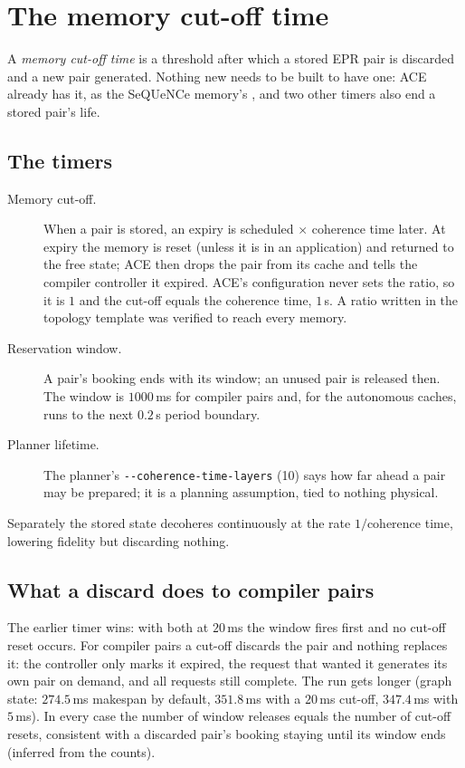 \chapter{The memory cut-off time}
\label{ch:cutoff}

A \emph{memory cut-off time} is a threshold after which a stored EPR pair is discarded and a new pair generated. Nothing new needs to be built to have one: ACE already has it, as the SeQUeNCe memory's
, and two other timers also end a stored pair's life.

\section{The timers}
\begin{description}
  \item[Memory cut-off.] When a pair is stored, an expiry is scheduled  $\times$ coherence time later. At expiry the memory is reset (unless it is in an application) and returned to the free state; ACE then drops the
        pair from its cache and tells the compiler controller it expired. ACE's configuration never sets the ratio, so it is $1$ and the cut-off equals the coherence time, $1$\,s. A ratio written in the topology template was verified to reach every memory.
  \item[Reservation window.] A pair's booking ends with its window; an unused pair is released then. The window is $1000$\,ms for compiler pairs and, for the autonomous caches, runs to the next $0.2$\,s period boundary.
  \item[Planner lifetime.] The planner's \verb|--coherence-time-layers| (10) says how far ahead a pair may be prepared; it is a planning assumption, tied to nothing physical.
\end{description}
Separately the stored state decoheres continuously at the rate $1/$coherence time, lowering fidelity but discarding nothing.

\section{What a discard does to compiler pairs}

The earlier timer wins: with both at $20$\,ms the window fires first and no cut-off reset occurs. For compiler pairs a cut-off discards the pair and nothing replaces it: the controller only marks it expired, the request that wanted it
generates its own pair on demand, and all requests still complete. The run gets longer (graph state: $274.5$\,ms makespan by default, $351.8$\,ms with a $20$\,ms cut-off, $347.4$\,ms with $5$\,ms). In every case the number of window releases equals the number of cut-off resets,
consistent with a discarded pair's booking staying until its window ends (inferred from the counts).

